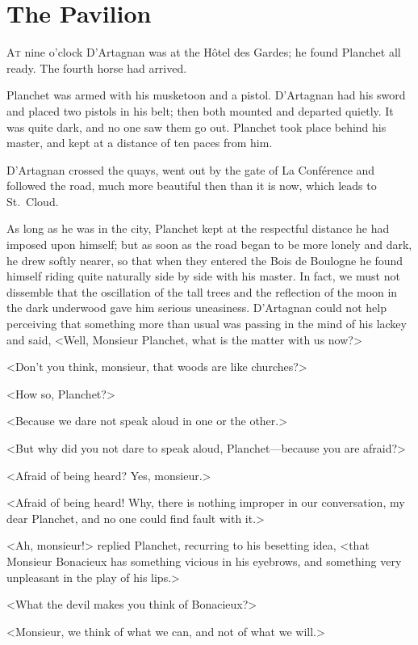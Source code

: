 
\chapter{The Pavilion}

\lettrine{A}{t} nine o'clock D'Artagnan was at the Hôtel des Gardes; he found Planchet all ready. The fourth horse had arrived. 

\zz
Planchet was armed with his musketoon and a pistol. D'Artagnan had his sword and placed two pistols in his belt; then both mounted and departed quietly. It was quite dark, and no one saw them go out. Planchet took place behind his master, and kept at a distance of ten paces from him. 

D'Artagnan crossed the quays, went out by the gate of La Conférence and followed the road, much more beautiful then than it is now, which leads to St.~Cloud. 

As long as he was in the city, Planchet kept at the respectful distance he had imposed upon himself; but as soon as the road began to be more lonely and dark, he drew softly nearer, so that when they entered the Bois de Boulogne he found himself riding quite naturally side by side with his master. In fact, we must not dissemble that the oscillation of the tall trees and the reflection of the moon in the dark underwood gave him serious uneasiness. D'Artagnan could not help perceiving that something more than usual was passing in the mind of his lackey and said, <Well, Monsieur Planchet, what is the matter with us now?> 

<Don't you think, monsieur, that woods are like churches?> 

<How so, Planchet?> 

<Because we dare not speak aloud in one or the other.> 

<But why did you not dare to speak aloud, Planchet—because you are afraid?> 

<Afraid of being heard? Yes, monsieur.> 

<Afraid of being heard! Why, there is nothing improper in our conversation, my dear Planchet, and no one could find fault with it.> 

<Ah, monsieur!> replied Planchet, recurring to his besetting idea, <that Monsieur Bonacieux has something vicious in his eyebrows, and something very unpleasant in the play of his lips.> 

<What the devil makes you think of Bonacieux?> 

<Monsieur, we think of what we can, and not of what we will.> 

